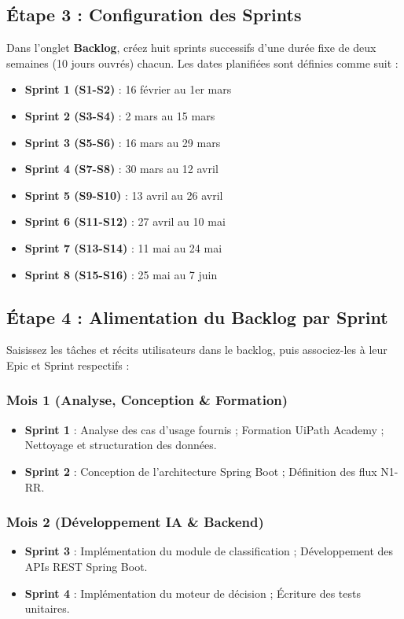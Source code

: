 \subsection{Étape 3 : Configuration des Sprints}
Dans l'onglet \textbf{Backlog}, créez huit sprints successifs d'une durée fixe de deux semaines (10 jours ouvrés) chacun. Les dates planifiées sont définies comme suit :
\begin{itemize}
    \item \textbf{Sprint 1 (S1-S2)} : 16 février au 1er mars
    \item \textbf{Sprint 2 (S3-S4)} : 2 mars au 15 mars
    \item \textbf{Sprint 3 (S5-S6)} : 16 mars au 29 mars
    \item \textbf{Sprint 4 (S7-S8)} : 30 mars au 12 avril
    \item \textbf{Sprint 5 (S9-S10)} : 13 avril au 26 avril
    \item \textbf{Sprint 6 (S11-S12)} : 27 avril au 10 mai
    \item \textbf{Sprint 7 (S13-S14)} : 11 mai au 24 mai
    \item \textbf{Sprint 8 (S15-S16)} : 25 mai au 7 juin
\end{itemize}

\subsection{Étape 4 : Alimentation du Backlog par Sprint}
Saisissez les tâches et récits utilisateurs dans le backlog, puis associez-les à leur Epic et Sprint respectifs :

\subsubsection{Mois 1 (Analyse, Conception \& Formation)}
\begin{itemize}
    \item \textbf{Sprint 1} : Analyse des cas d'usage fournis ; Formation UiPath Academy ; Nettoyage et structuration des données.
    \item \textbf{Sprint 2} : Conception de l'architecture Spring Boot ; Définition des flux N1-RR.
\end{itemize}

\subsubsection{Mois 2 (Développement IA \& Backend)}
\begin{itemize}
    \item \textbf{Sprint 3} : Implémentation du module de classification ; Développement des APIs REST Spring Boot.
    \item \textbf{Sprint 4} : Implémentation du moteur de décision ; Écriture des tests unitaires.
\end{itemize}

